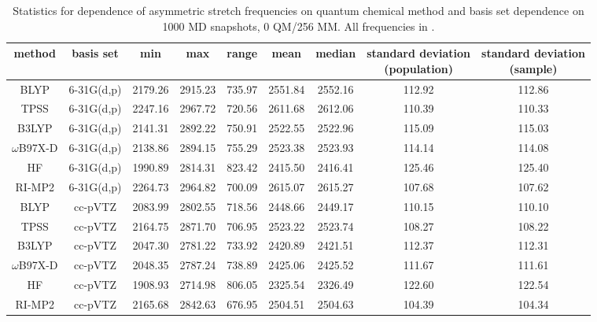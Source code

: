 \begin{landscape}
  \begin{table}
    \centering
    \caption[Statistical distribution of harmonic frequencies for MD snapshots]{Statistics for dependence of  asymmetric stretch frequencies on quantum chemical method and basis set dependence on \num{1000} MD snapshots, 0 QM/256 MM. All frequencies in \si{\wavenumber}.}
    \label{paper_02:tab:S1}
    \begin{tabular}{ccccccccc}
      \toprule
      method & basis set & min & max & range & mean & median & \thead{standard deviation \\ (population)} & \thead{standard deviation \\ (sample)} \\
      \midrule
      BLYP & 6-31G(d,p) & 2179.26 & 2915.23 & 735.97 & 2551.84 & 2552.16 & 112.92 & 112.86 \\
      TPSS & 6-31G(d,p) & 2247.16 & 2967.72 & 720.56 & 2611.68 & 2612.06 & 110.39 & 110.33 \\
      B3LYP & 6-31G(d,p) & 2141.31 & 2892.22 & 750.91 & 2522.55 & 2522.96 & 115.09 & 115.03 \\
      \(\omega\)B97X-D & 6-31G(d,p) & 2138.86 & 2894.15 & 755.29 & 2523.38 & 2523.93 & 114.14 & 114.08 \\
      HF & 6-31G(d,p) & 1990.89 & 2814.31 & 823.42 & 2415.50 & 2416.41 & 125.46 & 125.40 \\
      RI-MP2 & 6-31G(d,p) & 2264.73 & 2964.82 & 700.09 & 2615.07 & 2615.27 & 107.68 & 107.62 \\
      BLYP & cc-pVTZ & 2083.99 & 2802.55 & 718.56 & 2448.66 & 2449.17 & 110.15 & 110.10 \\
      TPSS & cc-pVTZ & 2164.75 & 2871.70 & 706.95 & 2523.22 & 2523.74 & 108.27 & 108.22 \\
      B3LYP & cc-pVTZ & 2047.30 & 2781.22 & 733.92 & 2420.89 & 2421.51 & 112.37 & 112.31 \\
      \(\omega\)B97X-D & cc-pVTZ & 2048.35 & 2787.24 & 738.89 & 2425.06 & 2425.52 & 111.67 & 111.61 \\
      HF & cc-pVTZ & 1908.93 & 2714.98 & 806.05 & 2325.54 & 2326.49 & 122.60 & 122.54 \\
      RI-MP2 & cc-pVTZ & 2165.68 & 2842.63 & 676.95 & 2504.51 & 2504.63 & 104.39 & 104.34 \\
      \bottomrule
    \end{tabular}
  \end{table}
\end{landscape}

